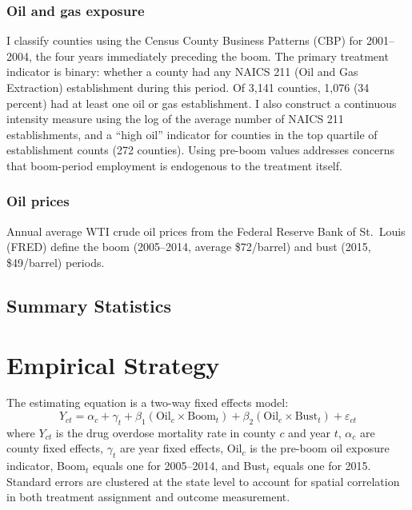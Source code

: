 \documentclass[12pt]{article}
\begin{document}
\subsubsection*{Oil and gas exposure} I classify counties using the Census County Business Patterns (CBP) for 2001--2004, the four years immediately preceding the boom. The primary treatment indicator is binary: whether a county had any NAICS 211 (Oil and Gas Extraction) establishment during this period. Of 3,141 counties, 1,076 (34 percent) had at least one oil or gas establishment. I also construct a continuous intensity measure using the log of the average number of NAICS 211 establishments, and a ``high oil'' indicator for counties in the top quartile of establishment counts (272 counties). Using pre-boom values addresses concerns that boom-period employment is endogenous to the treatment itself.

\subsubsection*{Oil prices} Annual average WTI crude oil prices from the Federal Reserve Bank of St.\ Louis (FRED) define the boom (2005--2014, average \$72/barrel) and bust (2015, \$49/barrel) periods.

\subsection{Summary Statistics}




\section{Empirical Strategy}

The estimating equation is a two-way fixed effects model:
\begin{equation}
Y_{ct} = \alpha_c + \gamma_t + \beta_1 (\text{Oil}_c \times \text{Boom}_t) + \beta_2 (\text{Oil}_c \times \text{Bust}_t) + \varepsilon_{ct}
\label{eq:did}
\end{equation}
where $Y_{ct}$ is the drug overdose mortality rate in county $c$ and year $t$, $\alpha_c$ are county fixed effects, $\gamma_t$ are year fixed effects, Oil$_c$ is the pre-boom oil exposure indicator, Boom$_t$ equals one for 2005--2014, and Bust$_t$ equals one for 2015. Standard errors are clustered at the state level to account for spatial correlation in both treatment assignment and outcome measurement.
\end{document}
